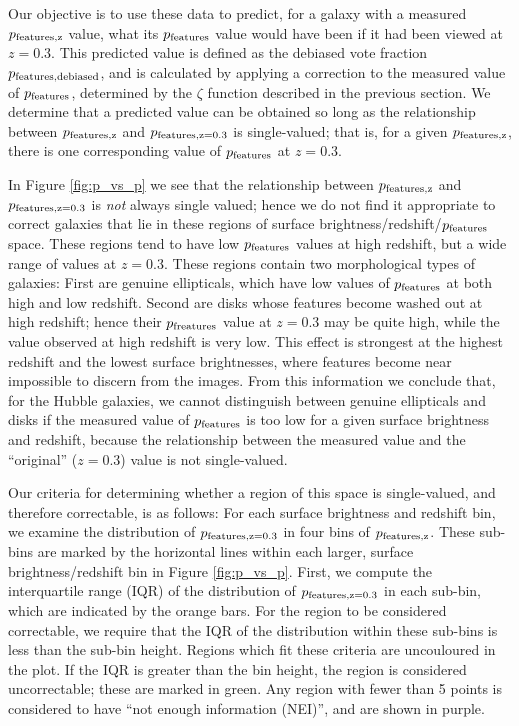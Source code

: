 \documentclass[usenatbib]{mn2e}
\begin{document}
Our objective is to use these data to predict, for a galaxy with a measured $p_{\rm features,z}$ value, what its $p_{\rm features}$ value would have been if it had been viewed at $z=0.3$. This predicted value is defined as the debiased vote fraction $p_{\rm features,debiased}$, and is calculated by applying a correction to the measured value of $p_{\rm features}$, determined by the $\zeta$ function described in the previous section. We determine that a predicted value can be obtained so long as the relationship between $p_{\rm features,z}$ and $p_{\rm features,z=0.3}$ is single-valued; that is, for a given $p_{\rm features,z}$, there is one corresponding value of $p_{\rm features}$ at $z=0.3$. 



In Figure \ref{fig:p_vs_p} we see that the relationship between $p_{\rm features,z}$ and $p_{\rm features,z=0.3}$ is \emph{not} always single valued; hence we do not find it appropriate to correct galaxies that lie in these regions of surface brightness/redshift/$p_{\rm features}$ space. These regions tend to have low $p_{\rm features}$ values at high redshift, but a wide range of values at $z=0.3$. These regions contain two morphological types of galaxies: First are genuine ellipticals, which have low values of $p_{\rm features}$ at both high and low redshift. Second are disks whose features become washed out at high redshift; hence their $p_{\rm freatures}$ value at $z=0.3$ may be quite high, while the value observed at high redshift is very low. This effect is strongest at the highest redshift and the lowest surface brightnesses, where features become near impossible to discern from the images. From this information we conclude that, for the Hubble galaxies, we cannot distinguish between genuine ellipticals and disks if the measured value of $p_{\rm features}$ is too low for a given surface brightness and redshift, because the relationship between the measured value and the ``original'' ($z=0.3$) value is not single-valued.  

Our criteria for determining whether a region of this space is single-valued, and therefore correctable, is as follows: For each surface brightness and redshift bin, we examine the distribution of $p_{\rm features,z=0.3}$ in four bins of $p_{\rm features,z}$. These sub-bins are marked by the horizontal lines within each larger, surface brightness/redshift bin in Figure \ref{fig:p_vs_p}. First, we compute the interquartile range (IQR) of the distribution of $p_{\rm features,z=0.3}$ in each sub-bin, which are indicated by the orange bars. For the region to be considered correctable, we require that the IQR of the distribution within these sub-bins is less than the sub-bin height. Regions which fit these criteria are uncouloured in the plot. If the IQR is greater than the bin height, the region is considered uncorrectable; these are marked in green. Any region with fewer than 5 points is considered to have ``not enough information (NEI)'', and are shown in purple. 
\end{document}
